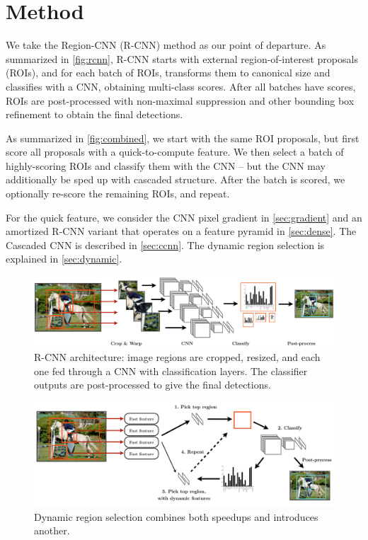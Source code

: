 \section{Method}\label{sec:method}

We take the Region-CNN (R-CNN) \cite{Girshick-CVPR-2014} method as our point of departure.
As summarized in \autoref{fig:rcnn}, R-CNN starts with external region-of-interest proposals (ROIs), and for each batch of ROIs, transforms them to canonical size and classifies with a CNN, obtaining multi-class scores.
After all batches have scores, ROIs are post-processed with non-maximal suppression and other bounding box refinement to obtain the final detections.

As summarized in \autoref{fig:combined}, we start with the same ROI proposals, but first score all proposals with a quick-to-compute feature.
We then select a batch of highly-scoring ROIs and classify them with the CNN -- but the CNN may additionally be sped up with cascaded structure.
After the batch is scored, we optionally re-score the remaining ROIs, and repeat.

For the quick feature, we consider the CNN pixel gradient in \autoref{sec:gradient} and an amortized R-CNN variant that operates on a feature pyramid in \autoref{sec:dense}.
The Cascaded CNN is described in \autoref{sec:ccnn}.
The dynamic region selection is explained in \autoref{sec:dynamic}.

\begin{figure}[h!]
\begin{center}
\includegraphics[width=0.98\columnwidth]{figures/rcnn.pdf}
\caption{
R-CNN architecture: image regions are cropped, resized, and each one fed through a CNN with classification layers.
The classifier outputs are post-processed to give the final detections.
}\label{fig:rcnn}
\end{center}
\end{figure}

\begin{figure}[h!]
\begin{center}
\includegraphics[width=0.98\columnwidth]{figures/combined.pdf}
\caption{
Dynamic region selection combines both speedups and introduces another.
}\label{fig:combined}
\end{center}
\end{figure}


